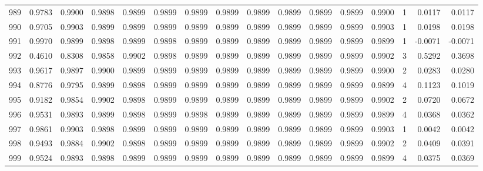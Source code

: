 \begin{tabular}{lrrrrrrrrrrrrrrr}
989 &      0.9783 &  0.9900 &  0.9898 &  0.9899 &  0.9899 &  0.9899 &  0.9899 &  0.9899 &  0.9899 &  0.9899 &   0.9899 &     0.9900 &      1 &                    0.0117 &                     0.0117 \\
990 &      0.9705 &  0.9903 &  0.9899 &  0.9899 &  0.9899 &  0.9899 &  0.9899 &  0.9899 &  0.9899 &  0.9899 &   0.9899 &     0.9903 &      1 &                    0.0198 &                     0.0198 \\
991 &      0.9970 &  0.9899 &  0.9898 &  0.9899 &  0.9898 &  0.9899 &  0.9899 &  0.9899 &  0.9899 &  0.9899 &   0.9899 &     0.9899 &      1 &                   -0.0071 &                    -0.0071 \\
992 &      0.4610 &  0.8308 &  0.9858 &  0.9902 &  0.9898 &  0.9899 &  0.9899 &  0.9899 &  0.9899 &  0.9899 &   0.9899 &     0.9902 &      3 &                    0.5292 &                     0.3698 \\
993 &      0.9617 &  0.9897 &  0.9900 &  0.9899 &  0.9899 &  0.9899 &  0.9899 &  0.9899 &  0.9899 &  0.9899 &   0.9899 &     0.9900 &      2 &                    0.0283 &                     0.0280 \\
994 &      0.8776 &  0.9795 &  0.9899 &  0.9898 &  0.9899 &  0.9899 &  0.9899 &  0.9899 &  0.9899 &  0.9899 &   0.9899 &     0.9899 &      4 &                    0.1123 &                     0.1019 \\
995 &      0.9182 &  0.9854 &  0.9902 &  0.9898 &  0.9899 &  0.9899 &  0.9899 &  0.9899 &  0.9899 &  0.9899 &   0.9899 &     0.9902 &      2 &                    0.0720 &                     0.0672 \\
996 &      0.9531 &  0.9893 &  0.9899 &  0.9898 &  0.9899 &  0.9898 &  0.9899 &  0.9899 &  0.9899 &  0.9899 &   0.9899 &     0.9899 &      4 &                    0.0368 &                     0.0362 \\
997 &      0.9861 &  0.9903 &  0.9898 &  0.9899 &  0.9899 &  0.9899 &  0.9899 &  0.9899 &  0.9899 &  0.9899 &   0.9899 &     0.9903 &      1 &                    0.0042 &                     0.0042 \\
998 &      0.9493 &  0.9884 &  0.9902 &  0.9898 &  0.9899 &  0.9899 &  0.9899 &  0.9899 &  0.9899 &  0.9899 &   0.9899 &     0.9902 &      2 &                    0.0409 &                     0.0391 \\
999 &      0.9524 &  0.9893 &  0.9898 &  0.9899 &  0.9899 &  0.9899 &  0.9899 &  0.9899 &  0.9899 &  0.9899 &   0.9899 &     0.9899 &      4 &                    0.0375 &                     0.0369 \\
\bottomrule
\end{tabular}
